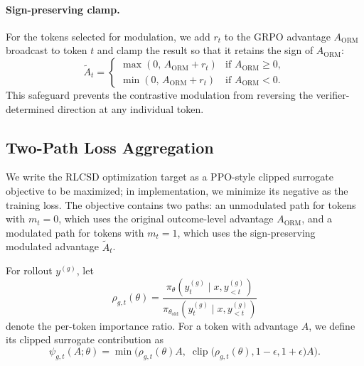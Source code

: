 \paragraph{Sign-preserving clamp.}
For the tokens selected for modulation, we add $r_t$ to the GRPO advantage $A_{\text{ORM}}$ broadcast to token $t$ and clamp the result so that it retains the sign of $A_{\text{ORM}}$:
\begin{equation}
\label{eq:samesign}
\tilde{A}_t =
\begin{cases}
\max(0, \, A_{\text{ORM}} + r_t) & \text{if } A_{\text{ORM}} \ge 0, \\
\min(0, \, A_{\text{ORM}} + r_t) & \text{if } A_{\text{ORM}} < 0.
\end{cases}
\end{equation}
This safeguard prevents the contrastive modulation from reversing the verifier-determined direction at any individual token.

\subsection{Two-Path Loss Aggregation}
\label{sec:method-loss}

We write the RLCSD optimization target as a PPO-style clipped surrogate
objective to be maximized; in implementation, we minimize its negative
as the training loss. The objective contains two paths: an unmodulated
path for tokens with $m_t=0$, which uses the original outcome-level
advantage $A_{\text{ORM}}$, and a modulated path for tokens with $m_t=1$,
which uses the sign-preserving modulated advantage $\tilde{A}_t$.

For rollout $y^{(g)}$, let
\begin{equation}
\rho_{g,t}(\theta)
=
\frac{
\pi_\theta(y^{(g)}_t \mid x, y^{(g)}_{<t})
}{
\pi_{\theta_{\text{old}}}(y^{(g)}_t \mid x, y^{(g)}_{<t})
}
\end{equation}
denote the per-token importance ratio. For a token with advantage $A$,
we define its clipped surrogate contribution as
\begin{equation}
\label{eq:clip-surrogate}
\psi_{g,t}(A; \theta)
=
\min\!\Big(
\rho_{g,t}(\theta) A,\;
\operatorname{clip}\!\big(\rho_{g,t}(\theta), 1-\epsilon, 1+\epsilon\big) A
\Big).
\end{equation}

